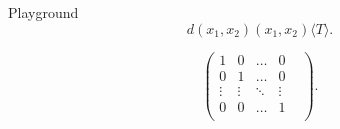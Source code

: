 \documentclass[class=article, crop=false]{standalone}
\begin{document}
\begin{zettel}{Playground}
\[
    d(x_1,x_2) (x_1,x_2) \langle T\rangle 
.\]

\[
    \begin{pmatrix}
    1       & 0       &  \dots  & 0 \\
    0       & 1       &  \dots  & 0 \\
     \vdots &  \vdots &  \ddots &  \vdots &  \\
    0       & 0       &  \dots  & 1 \\
    \end{pmatrix}
.\]
\end{zettel}
\end{document}
